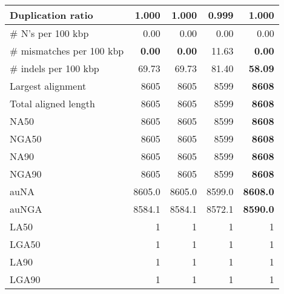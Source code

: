 \documentclass[12pt,a4paper]{article}
\begin{document}
\begin{table}[ht]
\begin{center}
\begin{tabular}{|l*{4}{|r}|}
Duplication ratio & 1.000 & 1.000 & {\bf 0.999} & 1.000 \\ \hline
\# N's per 100 kbp & 0.00 & 0.00 & 0.00 & 0.00 \\ \hline
\# mismatches per 100 kbp & {\bf 0.00} & {\bf 0.00} & 11.63 & {\bf 0.00} \\ \hline
\# indels per 100 kbp & 69.73 & 69.73 & 81.40 & {\bf 58.09} \\ \hline
Largest alignment & 8605 & 8605 & 8599 & {\bf 8608} \\ \hline
Total aligned length & 8605 & 8605 & 8599 & {\bf 8608} \\ \hline
NA50 & 8605 & 8605 & 8599 & {\bf 8608} \\ \hline
NGA50 & 8605 & 8605 & 8599 & {\bf 8608} \\ \hline
NA90 & 8605 & 8605 & 8599 & {\bf 8608} \\ \hline
NGA90 & 8605 & 8605 & 8599 & {\bf 8608} \\ \hline
auNA & 8605.0 & 8605.0 & 8599.0 & {\bf 8608.0} \\ \hline
auNGA & 8584.1 & 8584.1 & 8572.1 & {\bf 8590.0} \\ \hline
LA50 & 1 & 1 & 1 & 1 \\ \hline
LGA50 & 1 & 1 & 1 & 1 \\ \hline
LA90 & 1 & 1 & 1 & 1 \\ \hline
LGA90 & 1 & 1 & 1 & 1 \\ \hline
\end{tabular}
\end{center}
\end{table}
\end{document}
